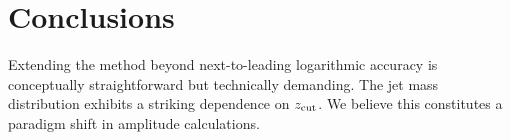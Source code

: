 \section{Conclusions}\label{sec:conclusions}

Extending the method beyond next-to-leading logarithmic accuracy is
conceptually straightforward but technically demanding. The jet mass
distribution exhibits a striking dependence on $z_{\rm cut}$. We believe
this constitutes a paradigm shift in amplitude calculations.

